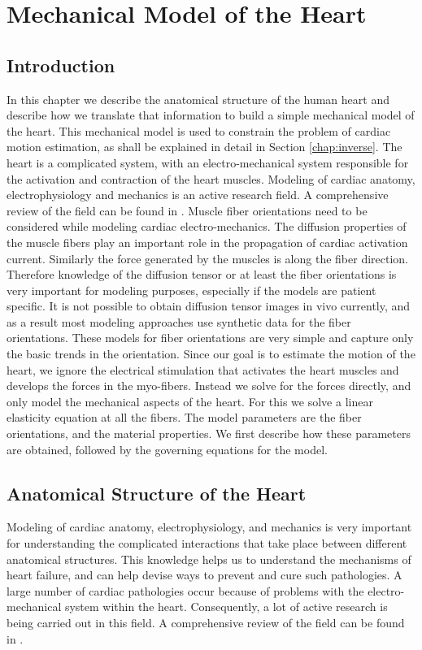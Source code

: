 \chapter{Mechanical Model of the Heart}
\label{sec:model}

\section{Introduction}
In this chapter we describe the anatomical structure of the human heart and describe how we translate that information to build a simple mechanical model of the heart. This mechanical model is used to constrain the problem of cardiac motion estimation, as shall be explained in detail in Section \ref{chap:inverse}. The heart is a complicated system, with an electro-mechanical system responsible for the activation and contraction of the heart muscles. Modeling of cardiac anatomy, electrophysiology and mechanics is an active research field. A comprehensive review of the field can be found in \cite {sachse04}. Muscle fiber orientations need to be considered while modeling cardiac electro-mechanics. The diffusion properties of the muscle fibers play an important role in the propagation of cardiac activation current. Similarly the force generated by the muscles is along the fiber direction. Therefore knowledge of the diffusion tensor or at least the fiber orientations is very important for modeling purposes, especially if the models are patient specific. It is not possible to obtain diffusion tensor images in vivo currently, and as a result most modeling approaches use synthetic data for the fiber orientations. These models for fiber orientations are very simple and capture only the basic trends in the orientation. Since our goal is to estimate the motion of the heart, we ignore the electrical stimulation that activates the heart muscles and develops the forces in the myo-fibers. Instead we solve for the forces directly, and only model the mechanical aspects of the heart. For this we solve a linear elasticity equation at all the fibers. The model parameters are the fiber orientations, and the material properties. We first describe how these parameters are obtained, followed by the governing equations for the model.

\section{Anatomical Structure of the Heart}
Modeling of cardiac anatomy, electrophysiology, and mechanics is very important for understanding the complicated interactions that take place between different anatomical structures. This knowledge helps us to understand the mechanisms of heart failure, and can help devise ways to prevent and cure such pathologies. A large number of cardiac pathologies occur because of problems with the electro-mechanical system within the heart. Consequently, a lot of active research is being carried out in this field.  A comprehensive review of the field can be found in \cite{mackerle2005fem, sachse04}. 


